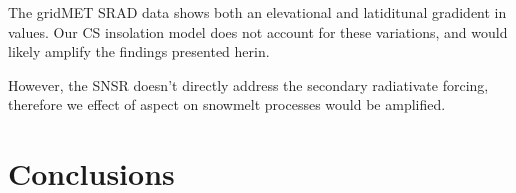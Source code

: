 The gridMET SRAD data shows both an elevational and latiditunal gradident in values. Our CS insolation model does not account for these variations, and would likely amplify the findings presented herin.

However, the SNSR doesn’t directly address the secondary radiativate forcing, therefore we effect of aspect on snowmelt processes would be amplified.

\hypertarget{ch2-conclusions}{\section{Conclusions}\label{ch2-conclusions}}



